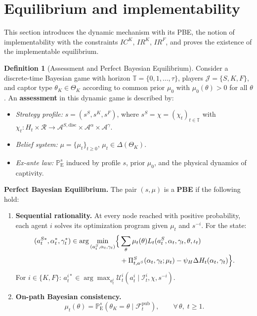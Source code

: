 \documentclass[ecta,nameyear,final,supplement]{econsocart}
\numberwithin{equation}{section}
\numberwithin{table}{section}
\theoremstyle{definition}
\newtheorem{definition}[theorem]{Definition}
\newcommand{\ProbE}{\mathbb{P}_{\mathrm{E}}}
\begin{document}
\section{Equilibrium and implementability}
\label{sec:equilibrio}

\noindent This section introduces the dynamic mechanism with its PBE, the
notion of implementability with the constraints $IC^K$, $IR^K$, $IR^F$, and
proves the existence of the implementable equilibrium.


\begin{definition}[Assessment and Perfect Bayesian Equilibrium]
\label{def:pbe-mechanism}
Consider a discrete-time Bayesian game with horizon
$\mathbb{T}=\{0,1,\ldots,\tau\}$, players $\mathcal{J}=\{S,K,F\}$, and captor
type $\theta_K\in\Theta_K$ according to common prior $\mu_0$ with
$\mu_0(\theta)>0$ for all $\theta$. An \textbf{assessment} in this dynamic game is described by:
\begin{itemize}
  \item \emph{Strategy profile:} $s=(s^S,s^K,s^F)$, where
  $s^S=\chi=(\chi_t)_{t\in\mathbb{T}}$ with
  $\chi_t:H_t\times\mathcal{R}
   \to\mathcal{A}^{S,\mathrm{disc}}\times\mathcal{A}^\alpha\times\mathcal{A}^\gamma$.
  \item \emph{Belief system:} $\mu=\{\mu_t\}_{t\ge 0}$,
  $\mu_t\in\Delta(\Theta_K)$.
  \item \emph{Ex-ante law:} $\ProbE^s$ induced by profile $s$, prior
  $\mu_0$, and the physical dynamics of captivity.
\end{itemize}

\noindent\textbf{Perfect Bayesian Equilibrium.} The pair $(s,\mu)$ is a
\textbf{PBE} if the following hold:
\begin{enumerate}
  \item[\textup{(a)}] \textbf{Sequential rationality.}
  At every node reached with positive probability, each agent $i$ solves
  its optimization program given $\mu_t$ and $s^{-i}$. For the state:
  \[
  \begin{aligned}
  (a_t^{S\ast},\alpha_t^\ast,\gamma_t^\ast)\in
  \arg\min_{(a_t^S,\alpha_t,\gamma_t)}
  \Bigl\{&
  \sum_\theta\mu_t(\theta)L_t(a_t^S,\alpha_t,\gamma_t,\theta,\iota_t)\\
  &+\Pi_{t,a^S}^S(\alpha_t,\gamma_t;\mu_t)
  -\psi_H\Delta H_t(\alpha_t,\gamma_t)\Bigr\}.
  \end{aligned}
  \]
  For $i\in\{K,F\}$:
  $a_t^{i\ast}\in\arg\max_{a_t^i}\mathcal{U}_t^i(a_t^i\mid\mathcal{I}_t^i,\chi,s^{-i})$.
  \item[\textup{(b)}] \textbf{On-path Bayesian consistency.}
  \[
  \mu_t(\theta)=\ProbE^s(\theta_K=\theta\mid\mathcal{F}_t^{\mathrm{pub}}),
  \qquad\forall\,\theta,\;t\ge 1.
  \]
\end{enumerate}
\end{definition}
\end{document}
